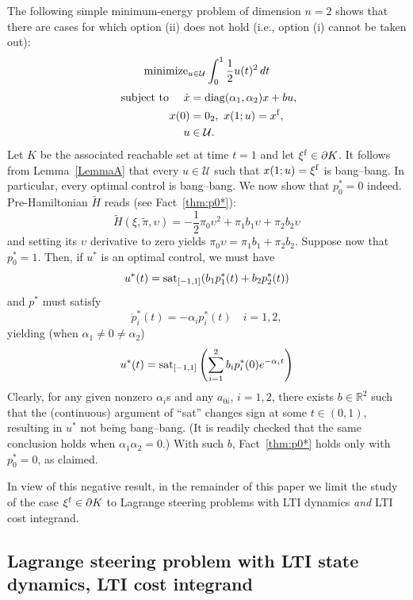 \documentclass[letterpaper,10pt,conference]{ieeeconf}
\def\R{{\mathbb{R}}}
\begin{document}
\noindent
The following simple minimum-energy problem of dimension $n=2$ 
shows that there are cases for which option (ii) does not hold (i.e.,
option (i) cannot be taken out):
\[
\begin{aligned}
{\rm minimize}_{u\in\mathcal U} \int_0^1 %
\frac{1}{2} u(t)^2  \,dt 
\end{aligned}
\]
\[
\begin{aligned}
{\rm ~subject~to~}\quad
\dot x &= {\rm diag}(\alpha_1,\alpha_2)x + bu,\\
~x(0)&=0_2, ~x(1;u)=x^{\rm f},\\
~u&\in\mathcal U.
\end{aligned}
\]
Let $K$ be the associated reachable set at time $t=1$ and
let $\xi^{\rm f}\in\partial K$.  It follows from Lemma~\ref{LemmaA}
that every $u\in\mathcal U$ such that $x(1;u)=\xi^{\rm f}$ is bang--bang.  
In particular, every optimal control is bang--bang.
We now show that $p_0^*=0$ indeed.
Pre-Hamiltonian $\tilde H$ reads (see Fact~\ref{thm:p0*}):
\[
\tilde H(\xi,\tilde\pi,\upsilon)=
-\frac{1}{2}\pi_0\upsilon^2+\pi_1b_1\upsilon +\pi_2b_2\upsilon
\]
and setting its $\upsilon$ derivative to zero yields
$
\pi_0\upsilon=\pi_1 b_1 + \pi_2 b_2.
$
Suppose now that 
$p_0^*=1$.  Then, if $u^*$ is an optimal control, we must have
\[
u^*(t)={\rm sat}_{[-1,1]} 
(b_1p_1^*(t)+b_2p_2^*(t))
\]
and $p^*$ must satisfy
\[
\dot p_i^*(t) = -\alpha_i p_i^*(t) \quad i=1,2,
\]
yielding (when $\alpha_1\not=0\not=\alpha_2$)
\[
u^*(t)={\rm sat}_{[-1,1]} 
\left(\sum_{i=1}^2 b_ip_i^*(0)e^{-\alpha_i t}\right)
\]
Clearly, for any given nonzero $\alpha_i$s and any $a_{0i}$, $i=1,2$,
there exists $b\in\R^2$ such that %
the (continuous) argument of ``sat'' changes sign
at some $t\in(0,1)$, resulting in $u^*$ not being bang--bang.  (It is 
readily checked that the same conclusion holds when $\alpha_1\alpha_2=0$.)
With such $b$, Fact~\ref{thm:p0*} holds only with $p_0^*=0$, as claimed.

In view of this negative result, in the remainder of this paper
we limit the study of the case $\xi^{\rm f}\in\partial K$ to Lagrange 
steering problems with LTI dynamics {\em and} LTI cost integrand.

\subsection{Lagrange steering problem with LTI state dynamics,
LTI cost integrand}
\label{sec:LTIdynANDcost}
\end{document}
